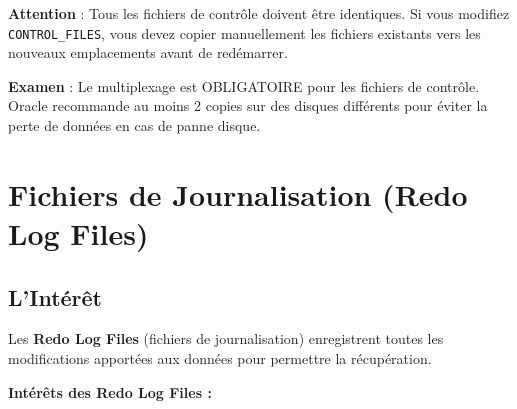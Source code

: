 \documentclass[11pt,a4paper]{article}
\begin{document}
\begin{dangerbox}
\textbf{Attention} : Tous les fichiers de contrôle doivent être identiques. Si vous modifiez \texttt{CONTROL\_FILES}, vous devez copier manuellement les fichiers existants vers les nouveaux emplacements avant de redémarrer.
\end{dangerbox}

\begin{tipbox}
\textbf{Examen} : Le multiplexage est OBLIGATOIRE pour les fichiers de contrôle. Oracle recommande au moins 2 copies sur des disques différents pour éviter la perte de données en cas de panne disque.
\end{tipbox}

\section{Fichiers de Journalisation (Redo Log Files)}

\subsection{L'Intérêt}

\begin{definitionbox}
Les \textbf{Redo Log Files} (fichiers de journalisation) enregistrent toutes les modifications apportées aux données pour permettre la récupération.
\end{definitionbox}

\textbf{Intérêts des Redo Log Files :}
\end{document}
